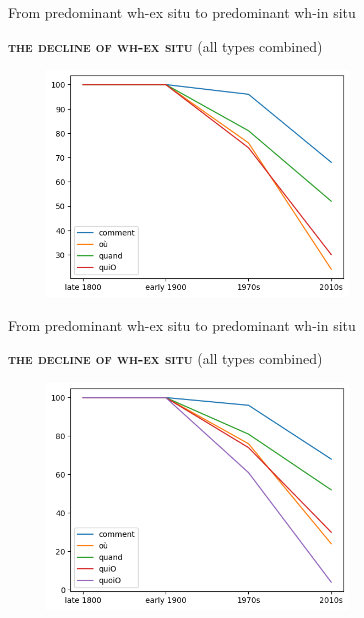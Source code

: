 \documentclass[lesson_slides]{subfiles}
\begin{document}
\begin{frame}[c]{From predominant wh-ex situ to predominant wh-in situ}

    \textbf{\textsc{the decline of wh-ex situ}} (all types combined)
    \begin{center}
        \includegraphics[width=10cm, height=6cm]{images/four.png}
    \end{center}
  
\end{frame}
\begin{frame}[c]{From predominant wh-ex situ to predominant wh-in situ}

    \textbf{\textsc{the decline of wh-ex situ}} (all types combined)
    \begin{center}
        \includegraphics[width=10cm, height=6cm]{images/all.png}
    \end{center}
  
\end{frame}
\end{document}
